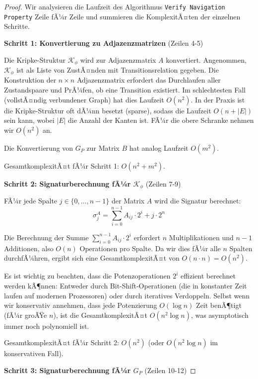 ﻿\documentclass[a4paper,12pt]{article}
\theoremstyle{definition}
\begin{document}
\begin{proof}
Wir analysieren die Laufzeit des Algorithmus \texttt{Verify Navigation Property} Zeile fÃ¼r Zeile und summieren die KomplexitÃ¤ten der einzelnen Schritte.

\textbf{Schritt 1: Konvertierung zu Adjazenzmatrizen} (Zeilen 4-5)

Die Kripke-Struktur $\mathcal{K}_{\phi}$ wird zur Adjazenzmatrix $A$ konvertiert. Angenommen, $\mathcal{K}_{\phi}$ ist als Liste von ZustÃ¤nden mit Transitionsrelation gegeben. Die Konstruktion der $n \times n$ Adjazenzmatrix erfordert das Durchlaufen aller Zustandspaare und PrÃ¼fen, ob eine Transition existiert. Im schlechtesten Fall (vollstÃ¤ndig verbundener Graph) hat dies Laufzeit $O(n^2)$. In der Praxis ist die Kripke-Struktur oft dÃ¼nn besetzt (sparse), sodass die Laufzeit $O(n + |E|)$ sein kann, wobei $|E|$ die Anzahl der Kanten ist. FÃ¼r die obere Schranke nehmen wir $O(n^2)$ an.

Die Konvertierung von $G_P$ zur Matrix $B$ hat analog Laufzeit $O(m^2)$.

GesamtkomplexitÃ¤t fÃ¼r Schritt 1: $O(n^2 + m^2)$.

\textbf{Schritt 2: Signaturberechnung fÃ¼r $\mathcal{K}_{\phi}$} (Zeilen 7-9)

FÃ¼r jede Spalte $j \in \{0, \ldots, n-1\}$ der Matrix $A$ wird die Signatur berechnet:
\begin{equation}
\sigma_j^A = \sum_{i=0}^{n-1} A_{ij} \cdot 2^i + j \cdot 2^n
\end{equation}

Die Berechnung der Summe $\sum_{i=0}^{n-1} A_{ij} \cdot 2^i$ erfordert $n$ Multiplikationen und $n-1$ Additionen, also $O(n)$ Operationen pro Spalte. Da wir dies fÃ¼r alle $n$ Spalten durchfÃ¼hren, ergibt sich eine GesamtkomplexitÃ¤t von $O(n \cdot n) = O(n^2)$.

Es ist wichtig zu beachten, dass die Potenzoperationen $2^i$ effizient berechnet werden kÃ¶nnen: Entweder durch Bit-Shift-Operationen (die in konstanter Zeit laufen auf modernen Prozessoren) oder durch iteratives Verdoppeln. Selbst wenn wir konservativ annehmen, dass jede Potenzierung $O(\log n)$ Zeit benÃ¶tigt (fÃ¼r groÃŸe $n$), ist die GesamtkomplexitÃ¤t $O(n^2 \log n)$, was asymptotisch immer noch polynomiell ist.

GesamtkomplexitÃ¤t fÃ¼r Schritt 2: $O(n^2)$ (oder $O(n^2 \log n)$ im konservativen Fall).

\textbf{Schritt 3: Signaturberechnung fÃ¼r $G_P$} (Zeilen 10-12)


\end{proof}
\end{document}
